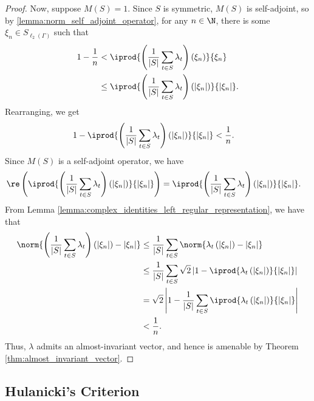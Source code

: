 \begin{proof}
  Now, suppose $M(S) = 1$. Since $S$ is symmetric, $M(S)$ is self-adjoint, so by \ref{lemma:norm_self_adjoint_operator}, for any $n\in \N$, there is some $\xi_n\in S_{\ell_2\left( \Gamma \right)}$ such that
  \begin{align*}
    1-\frac{1}{n} &< \iprod{\left( \frac{1}{\left\vert S \right\vert}\sum_{t\in S}\lambda_t \right)\left( \xi_n \right)}{\xi_n}\\
                  &\leq \iprod{\left( \frac{1}{\left\vert S \right\vert}\sum_{t\in S}\lambda_t \right)\left( \left\vert \xi_n \right\vert \right)}{\left\vert \xi_n \right\vert}.
  \end{align*}
  Rearranging, we get
  \begin{align*}
    1- \iprod{\left( \frac{1}{\left\vert S \right\vert}\sum_{t\in S}\lambda_t \right)\left( \left\vert \xi_n \right\vert \right)}{\left\vert \xi_n \right\vert} &< \frac{1}{n}.
  \end{align*}
  Since $M(S)$ is a self-adjoint operator, we have
  \begin{align*}
    \re\left( \iprod{\left( \frac{1}{\left\vert S \right\vert}\sum_{t\in S}\lambda_t \right)\left( \left\vert \xi_n \right\vert \right)}{\left\vert \xi_n \right\vert} \right) &= \iprod{\left( \frac{1}{\left\vert S \right\vert}\sum_{t\in S}\lambda_t \right)\left( \left\vert \xi_n \right\vert \right)}{\left\vert \xi_n \right\vert}.
  \end{align*}
  From Lemma \ref{lemma:complex_identities_left_regular_representation}, we have that
  \begin{align*}
    \norm{\left( \frac{1}{\left\vert S \right\vert}\sum_{t\in S}\lambda_t \right)\left( \left\vert \xi_n \right\vert \right) - \left\vert \xi_n \right\vert} &\leq \frac{1}{\left\vert S \right\vert}\sum_{t\in S}\norm{\lambda_t\left( \left\vert \xi_n \right\vert \right) - \left\vert \xi_n \right\vert}\\
                                                                                                                                                                    &\leq \frac{1}{\left\vert S \right\vert}\sum_{t\in S}\sqrt{2} \left\vert 1 - \iprod{\lambda_t\left( \left\vert \xi_n \right\vert \right)}{\left\vert \xi_n \right\vert} \right\vert\\
                                                                                                                                                                    &= \sqrt{2}\left\vert 1 - \frac{1}{\left\vert S \right\vert} \sum_{t\in S} \iprod{\lambda_t\left( \left\vert \xi_n \right\vert \right)}{\left\vert \xi_n \right\vert} \right\vert\\
                                                                                                                                                                    &< \frac{1}{n}.
  \end{align*}
  Thus, $\lambda$ admits an almost-invariant vector, and hence is amenable by Theorem \ref{thm:almost_invariant_vector}.
\end{proof}

\subsection{Hulanicki's Criterion}%
